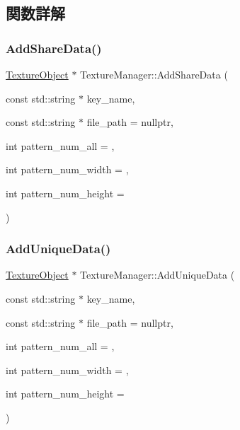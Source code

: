 \subsection{関数詳解}
\mbox{\label{class_texture_manager_a571c5b288fe16c53965f45d8bd7c8769}} 
\subsubsection{\texorpdfstring{Add\+Share\+Data()}{AddShareData()}}
{\footnotesize\ttfamily \mbox{\hyperlink{class_texture_object}{Texture\+Object}} $\ast$ Texture\+Manager\+::\+Add\+Share\+Data (\begin{DoxyParamCaption}\item[{const std\+::string $\ast$}]{key\+\_\+name,  }\item[{const std\+::string $\ast$}]{file\+\_\+path = {\ttfamily nullptr},  }\item[{int}]{pattern\+\_\+num\+\_\+all = {},  }\item[{int}]{pattern\+\_\+num\+\_\+width = {},  }\item[{int}]{pattern\+\_\+num\+\_\+height = {} }\end{DoxyParamCaption})\hspace{0.3cm}{\ttfamily [static]}}

\mbox{\label{class_texture_manager_af86003fd2afaf09f0295745d486e42e4}} 
\subsubsection{\texorpdfstring{Add\+Unique\+Data()}{AddUniqueData()}}
{\footnotesize\ttfamily \mbox{\hyperlink{class_texture_object}{Texture\+Object}} $\ast$ Texture\+Manager\+::\+Add\+Unique\+Data (\begin{DoxyParamCaption}\item[{const std\+::string $\ast$}]{key\+\_\+name,  }\item[{const std\+::string $\ast$}]{file\+\_\+path = {\ttfamily nullptr},  }\item[{int}]{pattern\+\_\+num\+\_\+all = {},  }\item[{int}]{pattern\+\_\+num\+\_\+width = {},  }\item[{int}]{pattern\+\_\+num\+\_\+height = {} }\end{DoxyParamCaption})\hspace{0.3cm}{\ttfamily [static]}}

